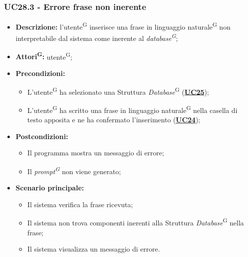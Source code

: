 \subsubsection{UC28.3 - Errore frase non inerente}
\label{sec:UC28.3}
\begin{itemize}
	\item \textbf{Descrizione:} l’utente\textsuperscript{G} inserisce una frase in linguaggio naturale\textsuperscript{G} non interpretabile dal sistema come inerente al \textit{database\textsuperscript{G}};
	\item \textbf{Attori\textsuperscript{G}:} utente\textsuperscript{G};
	\item \textbf{Precondizioni:} 
	\begin{itemize}
			\item L’utente\textsuperscript{G} ha selezionato una Struttura \textit{Database}\textsuperscript{G} (\hyperref[sec:UC25]{\textbf{UC25}});
		\item L’utente\textsuperscript{G} ha scritto una frase in linguaggio naturale\textsuperscript{G} nella casella di testo apposita e ne ha confermato l’inserimento (\hyperref[sec:UC27]{\textbf{UC24}});
	\end{itemize}
	\item \textbf{Postcondizioni:} 
	\begin{itemize}
		\item Il programma mostra un messaggio di errore;
		\item Il \textit{prompt\textsuperscript{G}} non viene generato;
	\end{itemize}
	\item \textbf{Scenario principale:} 
	\begin{itemize}
		\item Il sistema verifica la frase ricevuta;
		\item Il sistema non trova componenti inerenti alla Struttura \textit{Database}\textsuperscript{G} nella frase;
		\item Il sistema visualizza un messaggio di errore.
	\end{itemize}
\end{itemize}

